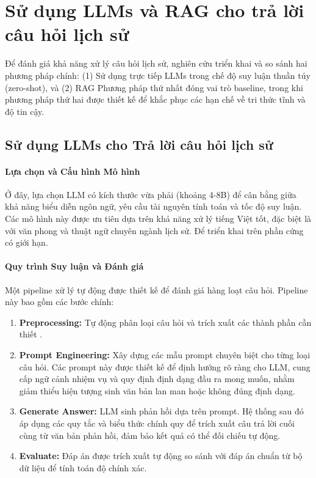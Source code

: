 \section{Sử dụng LLMs và RAG cho trả lời câu hỏi lịch sử}
\label{sec:llm_and_rag}

Để đánh giá khả năng xử lý câu hỏi lịch sử, nghiên cứu triển khai và so sánh hai phương pháp chính: (1) Sử dụng trực tiếp LLMs trong chế độ suy luận thuần túy (zero-shot), và (2) RAG Phương pháp thứ nhất đóng vai trò baseline, trong khi phương pháp thứ hai được thiết kế để khắc phục các hạn chế về tri thức tĩnh và độ tin cậy.

\subsection{Sử dụng LLMs cho Trả lời câu hỏi lịch sử}
\label{subsec:small_llm}

\paragraph{Lựa chọn và Cấu hình Mô hình}
Ở đây, lựa chọn LLM có kích thước vừa phải (khoảng 4-8B) để cân bằng giữa khả năng biểu diễn ngôn ngữ, yêu cầu tài nguyên tính toán và tốc độ suy luận. Các mô hình này được ưu tiên dựa trên khả năng xử lý tiếng Việt tốt, đặc biệt là với văn phong và thuật ngữ chuyên ngành lịch sử. Để triển khai trên phần cứng có giới hạn.

\paragraph{Quy trình Suy luận và Đánh giá}
Một pipeline xử lý tự động được thiết kế để đánh giá hàng loạt câu hỏi. Pipeline này bao gồm các bước chính:
\begin{enumerate}
    \item \textbf{Preprocessing:} Tự động phân loại câu hỏi và trích xuất các thành phần cần thiết .
    \item \textbf{Prompt Engineering:} Xây dựng các mẫu prompt chuyên biệt cho từng loại câu hỏi. Các prompt này được thiết kế để định hướng rõ ràng cho LLM, cung cấp ngữ cảnh nhiệm vụ và quy định định dạng đầu ra mong muốn, nhằm giảm thiểu hiện tượng sinh văn bản lan man hoặc không đúng định dạng.
    \item \textbf{Generate Answer:} LLM sinh phản hồi dựa trên prompt. Hệ thống sau đó áp dụng các quy tắc và biểu thức chính quy để trích xuất câu trả lời cuối cùng từ văn bản phản hồi, đảm bảo kết quả có thể đối chiếu tự động.
    \item \textbf{Evaluate:} Đáp án được trích xuất tự động so sánh với đáp án chuẩn từ bộ dữ liệu để tính toán độ chính xác.
\end{enumerate}

